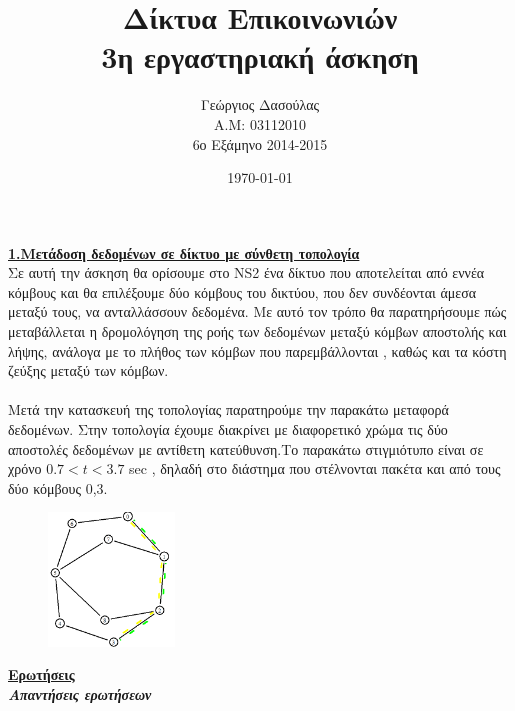 \documentclass{article}%
\begin{document}

\title{Δίκτυα Επικοινωνιών\\3η εργαστηριακή άσκηση}
\author{Γεώργιος Δασούλας\\Α.Μ: 03112010 \\ 6ο Εξάμηνο 2014-2015  }
\date{\today}
\maketitle

\textbf{{\underline{1.Μετάδοση δεδομένων σε δίκτυο με σύνθετη τοπολογία }}} \\

Σε αυτή την άσκηση θα ορίσουμε στο \textlatin{NS2} ένα δίκτυο που αποτελείται από
εννέα κόμβους και θα επιλέξουμε δύο κόμβους του δικτύου, που δεν συνδέονται άμεσα μεταξύ
τους, να ανταλλάσσουν δεδομένα. Με αυτό τον τρόπο θα παρατηρήσουμε πώς μεταβάλλεται η δρομολόγηση της ροής των δεδομένων μεταξύ κόμβων αποστολής και λήψης, ανάλογα με το πλήθος των κόμβων που παρεμβάλλονται , καθώς και τα κόστη ζεύξης μεταξύ των κόμβων.\\\\
Μετά την κατασκευή της τοπολογίας παρατηρούμε την παρακάτω μεταφορά δεδομένων. Στην τοπολογία έχουμε διακρίνει με διαφορετικό χρώμα τις δύο αποστολές δεδομένων με αντίθετη κατεύθυνση.Το παρακάτω στιγμιότυπο είναι σε χρόνο $0.7<t<3.7$ \textlatin{sec} , δηλαδή στο διάστημα που στέλνονται πακέτα και από τους δύο κόμβους 0,3.
\begin{figure}[htbp]
	\centering
		\includegraphics[width=0.30\textwidth]{1.png}
	\label{fig:1}
\end{figure}

\newpage


\textbf{\underline{Ερωτήσεις}} \\
\textsl{\textbf{{Απαντήσεις ερωτήσεων}}}
\end{document}
